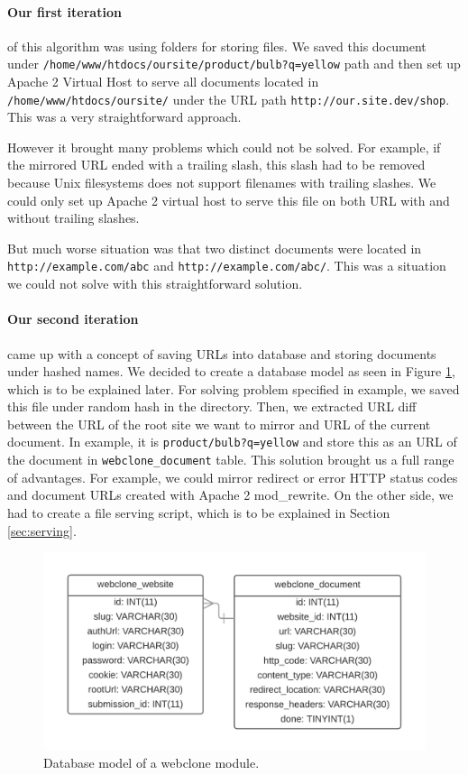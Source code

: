 \paragraph{Our first iteration} of this algorithm was using folders for storing files. We saved this document under \texttt{/home/www/htdocs/oursite/product/bulb?q=yellow} path and then set up Apache 2 Virtual Host to serve all documents located in \texttt{/home/www/htdocs/oursite/} under the URL path \texttt{http://our.site.dev/shop}. This was a very straightforward approach.

However it brought many problems which could not be solved. For example, if the mirrored URL ended with a trailing slash,  this slash had to be removed because Unix filesystems does not support filenames with trailing slashes. We could only set up Apache 2 virtual host to serve this file on both URL with and without trailing slashes.

But much worse situation was that two distinct documents were located in \texttt{http://example.com/abc} and \texttt{http://example.com/abc/}. This was a situation we could not solve with this straightforward solution.

\paragraph{Our second iteration} came up with a concept of saving URLs into database and storing documents under hashed names. We decided to create a database model as seen in Figure \ref{webclonemodel}, which is to be explained later. For solving problem specified in example, we saved this file under random hash in the directory. Then, we extracted URL diff between the URL of the root site we want to mirror and URL of the current document. In example, it is \texttt{product/bulb?q=yellow} and store this as an URL of the document in \texttt{webclone\_document} table. This solution brought us a full range of advantages. For example, we could mirror redirect or error HTTP status codes and document URLs created with Apache 2 mod\_rewrite. On the other side, we had to create a file serving script, which is to be explained in Section \ref{sec:serving}.

\begin{figure}[h]
    \centering
    \includegraphics[width=\textwidth]{images/databaseWebclone.png}
    \caption{Database model of a webclone module.}
    \label{webclonemodel}
\end{figure}


